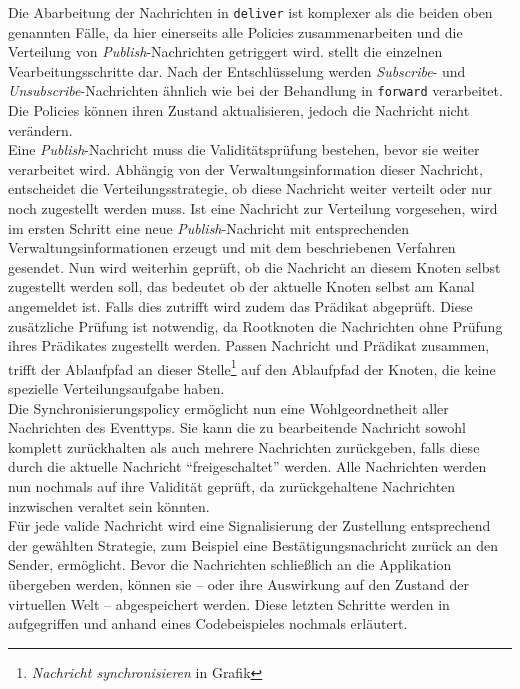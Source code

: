 Die Abarbeitung der Nachrichten in \texttt{deliver} ist komplexer als die beiden oben genannten Fälle, da hier einerseits alle Policies zusammenarbeiten und die Verteilung von \emph{Publish}-Nachrichten getriggert wird.  stellt die einzelnen Vearbeitungsschritte dar. Nach der Entschlüsselung werden \emph{Subscribe}- und \emph{Unsubscribe}-Nachrichten ähnlich wie bei der Behandlung in \texttt{forward} verarbeitet. Die Policies können ihren Zustand aktualisieren, jedoch die Nachricht nicht verändern.\\
Eine \emph{Publish}-Nachricht muss die Validitätsprüfung bestehen, bevor sie weiter verarbeitet wird. Abhängig von der Verwaltungsinformation dieser Nachricht, entscheidet die Verteilungsstrategie, ob diese Nachricht weiter verteilt oder nur noch zugestellt werden muss. Ist eine Nachricht zur Verteilung vorgesehen, wird im ersten Schritt eine neue \emph{Publish}-Nachricht mit entsprechenden Verwaltungsinformationen erzeugt und mit dem beschriebenen Verfahren gesendet. Nun wird weiterhin geprüft, ob die Nachricht an diesem Knoten selbst zugestellt werden soll, das bedeutet ob der aktuelle Knoten selbst am Kanal angemeldet ist. Falls dies zutrifft wird zudem das Prädikat abgeprüft. Diese zusätzliche Prüfung ist notwendig, da Rootknoten die Nachrichten ohne Prüfung ihres Prädikates zugestellt werden. Passen Nachricht und Prädikat zusammen, trifft der Ablaufpfad an dieser Stelle\footnote{\emph{Nachricht synchronisieren} in Grafik } auf den Ablaufpfad der Knoten, die keine spezielle Verteilungsaufgabe haben.\\
Die Synchronisierungspolicy ermöglicht nun eine Wohlgeordnetheit aller Nachrichten des Eventtyps. Sie kann die zu bearbeitende Nachricht sowohl komplett zurückhalten als auch mehrere Nachrichten zurückgeben, falls diese durch die aktuelle Nachricht \enquote{freigeschaltet} werden. Alle Nachrichten werden nun nochmals auf ihre Validität geprüft, da zurückgehaltene Nachrichten inzwischen veraltet sein könnten.\\
Für jede valide Nachricht wird eine Signalisierung der Zustellung entsprechend der gewählten Strategie, zum Beispiel eine Bestätigungsnachricht zurück an den Sender, ermöglicht. Bevor die Nachrichten schließlich an die Applikation übergeben werden, können sie -- oder ihre Auswirkung auf den Zustand der virtuellen Welt -- abgespeichert werden. Diese letzten Schritte werden in  aufgegriffen und anhand eines Codebeispieles nochmals erläutert.


